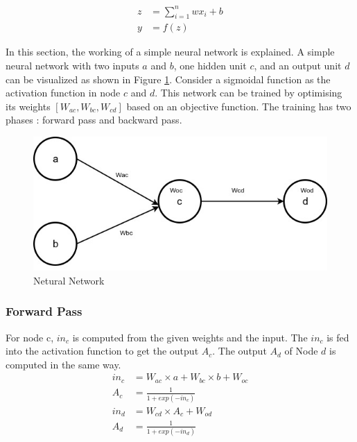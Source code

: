 \documentclass[12pt]{report} %
\begin{document}
\begin{align}
z & = \sum_{i=1}^{n} wx_i + b \\
y & = f(z)
\end{align}

In this section, the working of a simple neural network is explained. A simple neural network with two inputs $a$ and $b$, one hidden unit $c$, and an output unit $d$ can be visualized as shown in Figure \ref{net}. Consider a sigmoidal function as the activation function in node $c$ and $d$. This network can be trained by optimising its weights $[W_{ac}, W_{bc}, W_{cd}]$ based on an objective function. The training has two phases : forward pass and backward pass.

\begin{figure}[h]
	\centering
	\caption{Netural Network}
	\label{net}
	\includegraphics[scale=0.44]{image/Trace_Back_Prop.jpg}
\end{figure} 



\subsubsection*{Forward Pass}

For node c, $in_{c}$ is computed from the given weights and the input. The $in_{c}$ is fed into the activation function to get the output $A_{c}$. The output $A_{d}$ of Node $d$ is computed in the same way.
\begin{align} 
in_{c}	& = W_{ac} \times a + W_{bc} \times b + W_{oc} \\
A_{c} & = \frac{1}{1+exp(-in_{c})} \\
in_{d}	& = W_{cd} \times A_c + W_{od} \\
A_{d} & = \frac{1}{1+exp(-in_{d})} 
\end{align}

%
\end{document}
